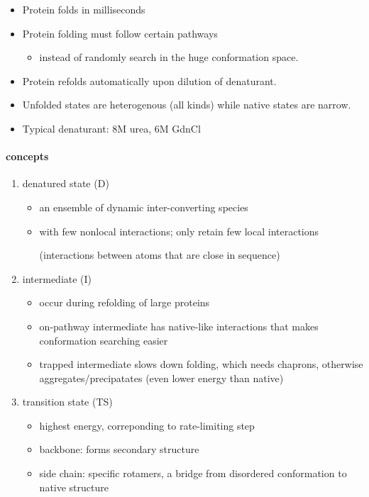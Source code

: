 \documentclass[]{article}
\let\oldparagraph\paragraph
\renewcommand{\paragraph}[1]{\oldparagraph{#1}\mbox{}}
\begin{document}
\begin{itemize}
\item
  Protein folds in milliseconds
\item
  Protein folding must follow certain pathways

  \begin{itemize}
  \item
    instead of randomly search in the huge conformation space.
  \end{itemize}
\item
  Protein refolds automatically upon dilution of denaturant.
\item
  Unfolded states are heterogenous (all kinds) while native states are
  narrow.
\item
  Typical denaturant: 8M urea, 6M GdnCl
\end{itemize}

\hypertarget{concepts}{%
\paragraph{concepts}\label{concepts}}

\begin{enumerate}
\def\labelenumi{\arabic{enumi}.}
\item
  denatured state (D)

  \begin{itemize}
  \item
    an ensemble of dynamic inter-converting species
  \item
    with few nonlocal interactions; only retain few local interactions

    (interactions between atoms that are close in sequence)
  \end{itemize}
\item
  intermediate (I)

  \begin{itemize}
  \item
    occur during refolding of large proteins
  \item
    on-pathway intermediate has native-like interactions that makes
    conformation searching easier
  \item
    trapped intermediate slows down folding, which needs chaprons,
    otherwise aggregates/precipatates (even lower energy than native)
  \end{itemize}
\item
  transition state (TS)

  \begin{itemize}
  \item
    highest energy, correponding to rate-limiting step
  \item
    backbone: forms secondary structure
  \item
    side chain: specific rotamers, a bridge from disordered conformation
    to native structure
  \end{itemize}
\end{enumerate}
\end{document}
